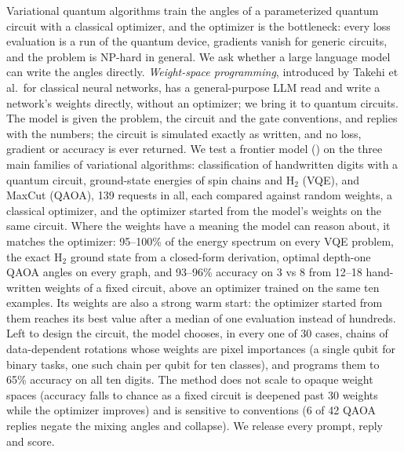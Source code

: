 Variational quantum algorithms train the angles of a parameterized quantum circuit with a classical optimizer, and the optimizer is the bottleneck: every loss evaluation is a run of the quantum device, gradients vanish for generic circuits, and the problem is NP-hard in general. We ask whether a large language model can write the angles directly. \emph{Weight-space programming}, introduced by Takehi et al.\ for classical neural networks, has a general-purpose LLM read and write a network's weights directly, without an optimizer; we bring it to quantum circuits. The model is given the problem, the circuit and the gate conventions, and replies with the numbers; the circuit is simulated exactly as written, and no loss, gradient or accuracy is ever returned. We test a frontier model (\gpt) on the three main families of variational algorithms: classification of handwritten digits with a quantum circuit, ground-state energies of spin chains and H$_2$ (VQE), and MaxCut (QAOA), 139 requests in all, each compared against random weights, a classical optimizer, and the optimizer started from the model's weights on the same circuit. Where the weights have a meaning the model can reason about, it matches the optimizer: 95--100\% of the energy spectrum on every VQE problem, the exact H$_2$ ground state from a closed-form derivation, optimal depth-one QAOA angles on every graph, and 93--96\% accuracy on 3 vs 8 from 12--18 hand-written weights of a fixed circuit, above an optimizer trained on the same ten examples. Its weights are also a strong warm start: the optimizer started from them reaches its best value after a median of one evaluation instead of hundreds. Left to design the circuit, the model chooses, in every one of 30 cases, chains of data-dependent rotations whose weights are pixel importances (a single qubit for binary tasks, one such chain per qubit for ten classes), and programs them to 65\% accuracy on all ten digits. The method does not scale to opaque weight spaces (accuracy falls to chance as a fixed circuit is deepened past 30 weights while the optimizer improves) and is sensitive to conventions (6 of 42 QAOA replies negate the mixing angles and collapse). We release every prompt, reply and score.
